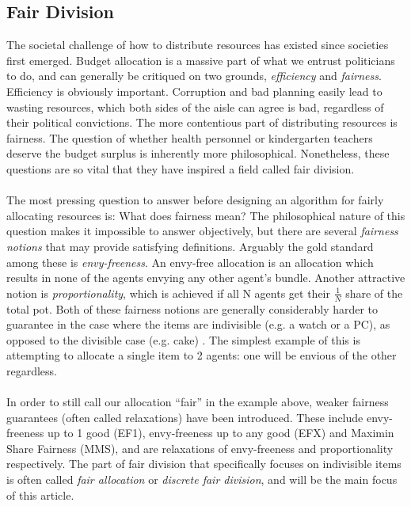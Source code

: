 \documentclass[b5paper]{article}
\begin{document}
\subsection{Fair Division}
The societal challenge of how to distribute resources has existed since societies first emerged.
Budget allocation is a massive part of what we entrust politicians to do, and can generally be critiqued on two grounds, \emph{efficiency} and \emph{fairness}.
Efficiency is obviously important. Corruption and bad planning easily lead to wasting resources, which both sides of the aisle can agree is bad, regardless of their political convictions.
The more contentious part of distributing resources is fairness. 
The question of whether health personnel or kindergarten teachers deserve the budget surplus is inherently more philosophical.
Nonetheless, these questions are so vital that they have inspired a field called fair division.
\\ \\
The most pressing question to answer before designing an algorithm for fairly allocating resources is: What does fairness mean?
The philosophical nature of this question makes it impossible to answer objectively, but there are several \emph{fairness notions} that may provide satisfying definitions.
Arguably the gold standard among these is \emph{envy-freeness}. An envy-free allocation is an allocation which results in none of the agents envying any other agent's bundle.
Another attractive notion is \emph{proportionality}, which is achieved if all N agents get their \(\frac{1}{N}\) share of the total pot.
Both of these fairness notions are generally considerably harder to guarantee in the case where the items are indivisible (e.g. a watch or a PC), as opposed to the divisible case (e.g. cake) \cite{amanatidis_fair_2022}.
The simplest example of this is attempting to allocate a single item to 2 agents: one will be envious of the other regardless.
\\ \\
In order to still call our allocation ``fair'' in the example above, weaker fairness guarantees (often called relaxations) have been introduced.
These include envy-freeness up to 1 good (EF1), envy-freeness up to any good (EFX) and Maximin Share Fairness (MMS), and are relaxations of envy-freeness and proportionality respectively.
The part of fair division that specifically focuses on indivisible items is often called \emph{fair allocation} or \emph{discrete fair division}, and will be the main focus of this article. 
\end{document}
